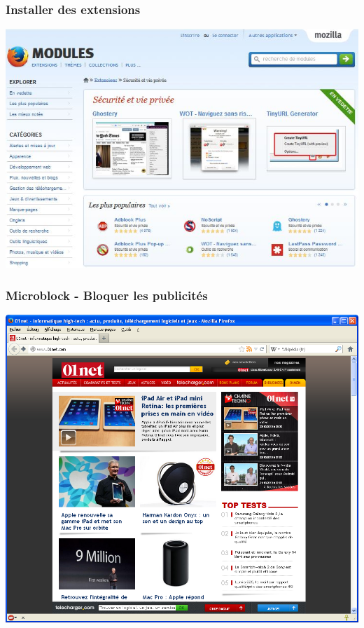 \documentclass{beamer}
\begin{document}
\begin{frame}
\frametitle{Installer des extensions}
\begin{center}
\includegraphics[scale=0.75] {./images/extensions_firefox.jpg}
\end{center}
\end{frame}

\begin{frame}
\frametitle{Microblock - Bloquer les publicités}
\begin{center}
\includegraphics[scale=0.4] {./images/Adblock02.png}
\end{center}
\end{frame}
\end{document}
